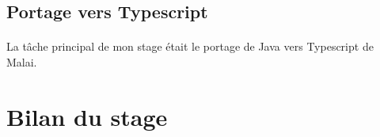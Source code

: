 \documentclass[11pt, a4paper, pdftex]{article}
\begin{document}
        \subsection{Portage vers Typescript}\label{subsec:mainjob}
            \paragraph{}
                La tâche principal de mon stage était le portage de Java vers Typescript de Malai. %
    \newpage
    \section{Bilan du stage}\label{sec:bilsta}

    \newpage

\end{document}
